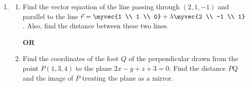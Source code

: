 \begin{enumerate}[label=\thesubsection.\arabic*, ref=\thesubsection.\theenumi]
\begin{figure}[H]
    \label{fig:area_q15}
\end{figure}
    \item
    \begin{enumerate}[label=(\alph*), leftmargin=1.5em, labelsep=0.5em]
        \item Find the vector equation of the line passing through $(2,1,-1)$ and parallel to the line $\vec{r} = \myvec{1 \\ 1 \\ 0} + \lambda\myvec{2 \\ -1 \\ 1}$. Also, find the distance between these two lines.

        \begin{center}
            \textbf{OR}
        \end{center}

        \item Find the coordinates of the foot $Q$ of the perpendicular drawn from the point $P(1,3,4)$ to the plane $2x-y+z+3=0$. Find the distance $PQ$ and the image of $P$ treating the plane as a mirror.
    \end{enumerate} \vspace{2pt}


\end{enumerate}
